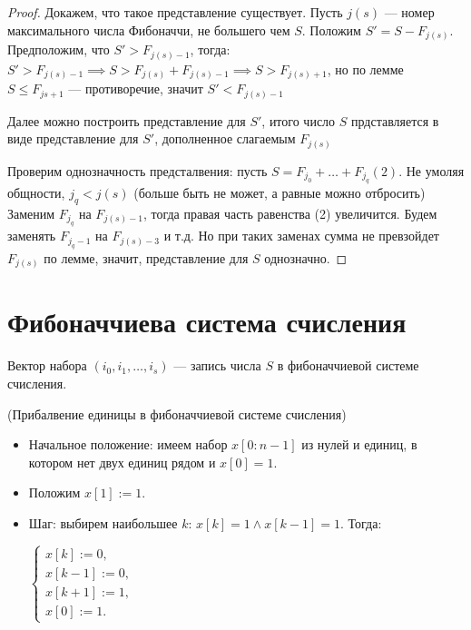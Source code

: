 \begin{proof}
    Докажем, что такое представление существует. 
    Пусть $j(s)$ --- номер максимального числа Фибоначчи, не большего чем $S$. Положим $S' = S - F_{j(s)}$. 
    Предположим, что $S' > F_{j(s)-1}$, тогда: $S' > F_{j(s)-1} \implies S > F_{j(s)} + F_{j(s)-1} \implies S > F_{j(s)+1}$, но по лемме $S \leq F_{j{s}+1}$ --- противоречие, значит $S' < F_{j(s)-1}$

    Далее можно построить представление для $S'$, итого число $S$ прдставляется в виде представление для $S'$, дополненное слагаемым $F_{j(s)}$

    Проверим однозначность предсталвения: пусть $S = F_{j_0} + \ldots + F_{j_q} (2)$. Не умоляя общности, $j_q < j(s)$ (больше быть не может, а равные можно отбросить)
    Заменим $F_{j_q}$ на $F_{j(s)-1}$, тогда правая часть равенства (2) увеличится. Будем заменять $F_{j_q - 1}$ на $F_{j(s)-3}$ и т.д. Но при таких заменах сумма не превзойдет $F_{j(s)}$ по лемме, значит, представление для $S$ однозначно.
\end{proof}


\section{Фибоначчиева система счисления}

Вектор набора $(i_0, i_1, \ldots, i_s)$ --- запись числа $S$ в фибоначчиевой системе счисления.

\begin{algoritm} (Прибалвение единицы в фибоначчиевой системе счисления)
    \begin{itemize}
        \item Начальное положение: имеем набор $x[0: n - 1]$ из нулей и единиц, в котором нет двух единиц рядом и $x[0] = 1$.
        \item Положим $x[1] := 1$.
        \item Шаг: выбирем наибольшее $k$: $x[k] = 1 \land x[k-1] = 1$. Тогда:
        
        $\begin{cases}

            x[k] := 0, \\
            x[k-1] := 0, \\
            x[k+1] := 1, \\
            x[0] := 1.
        \end{cases}$
    \end{itemize}
\end{algoritm}

